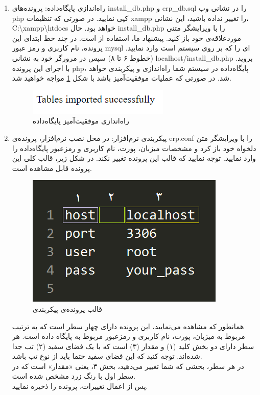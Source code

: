 \begin{enumerate}
		
	\item راه‌اندازی پایگاه‌داده:
	پرونده‌های install\_db.php و erp\_db.sql را در نشانی وب php کپی نمایید. در صورتی که تنظیمات xampp را تغییر نداده باشید، این نشانی، 
	  C:\textbackslash{}xampp\textbackslash{}htdocs خواهد بود. حال install\_db.php را با ویرایشگر متنی موردعلاقه‌ی خود باز کنید. پیشنهاد ما، استفاده از
	است. در چند خط ابتدای این پرونده، نام کاربری و رمز عبور mysql ای را که بر روی سیستم است وارد نمایید. (خطوط ۶ تا ۸)
	 سپس در مرورگر خود به نشانی
	localhost/install\_db.php
	بروید. با اجرای این پرونده php، پایگاه‌داده در سیستم شما راه‌اندازی و پیکربندی خواهد شد. در صورتی که عملیات موفقیت‌آمیز باشد با شکل 
	\ref{f15}
	مواجه خواهید شد.
			\begin{figure}[H]
				\centering
				\includegraphics[scale=0.7]{img/install/db}
				\caption{راه‌اندازی موفقیت‌آمیز پایگاه‌داده}
				\label{f15}
			\end{figure}
	
	\item پیکربندی نرم‌افزار:
	در محل نصب نرم‌افزار، پرونده‌ی erp.conf را با ویرایشگر متن دلخواه خود باز کرد و مشخصات میزبان، پورت، نام کاربری و رمزعبور پایگاه‌داده را وارد نمایید. توجه نمایید که قالب این پرونده تغییر نکند. در شکل زیر، قالب کلی این پرونده قابل مشاهده است.
	
			\begin{figure}[H]
				\centering
				\includegraphics[scale=0.6]{img/install/conf}
				\caption{قالب پرونده‌ی پیکربندی}
			\end{figure}
	
	همانطور که مشاهده می‌نمایید، این پرونده دارای چهار سطر است که به ترتیب مربوط به میزبان، پورت، نام کاربری و رمزعبور مربوط به پایگاه داده است. هر سطر دارای دو بخش کلید (۱) و مقدار (۳) است که با یک فضای سفید (۲) تب
	جدا شده‌اند. توجه کنید که این فضای سفید حتما باید از نوع تب باشد.\\
	در هر سطر، بخشی که شما تغییر می‌دهید، بخش ۳، یعنی «مقدار» است که در سطر اول با رنگ زرد مشخص شده است.\\
	پس از اعمال تغییرات، پرونده را ذخیره نمایید.
	

\end{enumerate}

